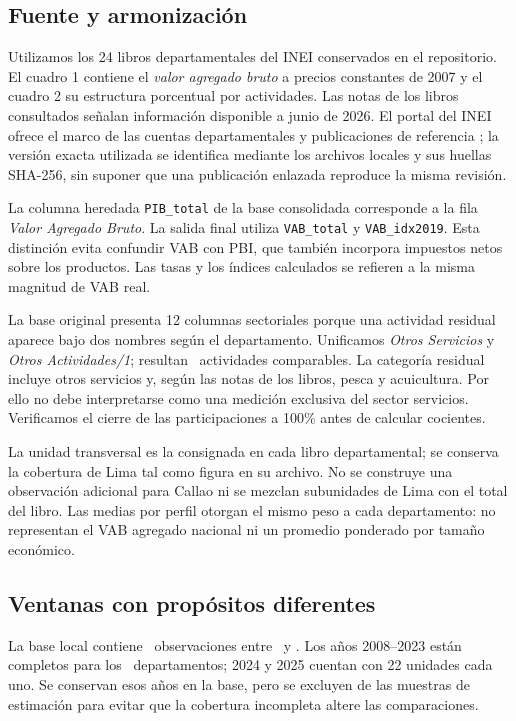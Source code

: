 \subsection{Fuente y armonización}
Utilizamos los 24 libros departamentales del INEI conservados en el repositorio. El cuadro 1 contiene el \textit{valor agregado bruto} a precios constantes de 2007 y el cuadro 2 su estructura porcentual por actividades. Las notas de los libros consultados señalan información disponible a junio de 2026. El portal del INEI ofrece el marco de las cuentas departamentales y publicaciones de referencia \cite{inei}; la versión exacta utilizada se identifica mediante los archivos locales y sus huellas SHA-256, sin suponer que una publicación enlazada reproduce la misma revisión.

La columna heredada \texttt{PIB\_total} de la base consolidada corresponde a la fila \textit{Valor Agregado Bruto}. La salida final utiliza \texttt{VAB\_total} y \texttt{VAB\_idx2019}. Esta distinción evita confundir VAB con PBI, que también incorpora impuestos netos sobre los productos. Las tasas y los índices calculados se refieren a la misma magnitud de VAB real.

La base original presenta 12 columnas sectoriales porque una actividad residual aparece bajo dos nombres según el departamento. Unificamos \textit{Otros Servicios} y \textit{Otros Actividades/1}; resultan \Sectors\ actividades comparables. La categoría residual incluye otros servicios y, según las notas de los libros, pesca y acuicultura. Por ello no debe interpretarse como una medición exclusiva del sector servicios. Verificamos el cierre de las participaciones a 100\% antes de calcular cocientes.

La unidad transversal es la consignada en cada libro departamental; se conserva la cobertura de Lima tal como figura en su archivo. No se construye una observación adicional para Callao ni se mezclan subunidades de Lima con el total del libro. Las medias por perfil otorgan el mismo peso a cada departamento: no representan el VAB agregado nacional ni un promedio ponderado por tamaño económico.

\subsection{Ventanas con propósitos diferentes}
La base local contiene \BaseObs\ observaciones entre \BaseStart\ y \BaseEnd. Los años 2008--2023 están completos para los \Departments\ departamentos; 2024 y 2025 cuentan con 22 unidades cada uno. Se conservan esos años en la base, pero se excluyen de las muestras de estimación para evitar que la cobertura incompleta altere las comparaciones.

